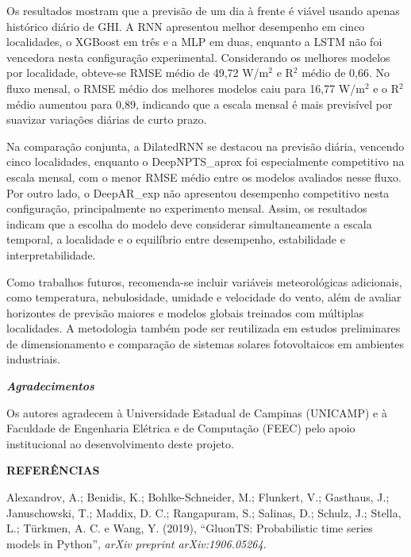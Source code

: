 \documentclass[12pt,a4paper]{article}
\begin{document}
Os resultados mostram que a previsão de um dia à frente é viável usando apenas histórico diário de GHI. A RNN apresentou melhor desempenho em cinco localidades, o XGBoost em três e a MLP em duas, enquanto a LSTM não foi vencedora nesta configuração experimental. Considerando os melhores modelos por localidade, obteve-se RMSE médio de 49,72 W/m$^2$ e R$^2$ médio de 0,66. No fluxo mensal, o RMSE médio dos melhores modelos caiu para 16,77 W/m$^2$ e o R$^2$ médio aumentou para 0,89, indicando que a escala mensal é mais previsível por suavizar variações diárias de curto prazo.

Na comparação conjunta, a DilatedRNN se destacou na previsão diária, vencendo cinco localidades, enquanto o DeepNPTS\_aprox foi especialmente competitivo na escala mensal, com o menor RMSE médio entre os modelos avaliados nesse fluxo. Por outro lado, o DeepAR\_exp não apresentou desempenho competitivo nesta configuração, principalmente no experimento mensal. Assim, os resultados indicam que a escolha do modelo deve considerar simultaneamente a escala temporal, a localidade e o equilíbrio entre desempenho, estabilidade e interpretabilidade.

Como trabalhos futuros, recomenda-se incluir variáveis meteorológicas adicionais, como temperatura, nebulosidade, umidade e velocidade do vento, além de avaliar horizontes de previsão maiores e modelos globais treinados com múltiplas localidades. A metodologia também pode ser reutilizada em estudos preliminares de dimensionamento e comparação de sistemas solares fotovoltaicos em ambientes industriais.

\vspace{12pt}

\noindent\textbf{\textit{Agradecimentos}}

Os autores agradecem à Universidade Estadual de Campinas (UNICAMP) e à Faculdade de Engenharia Elétrica e de Computação (FEEC) pelo apoio institucional ao desenvolvimento deste projeto.

\vspace{12pt}

\noindent\textbf{REFERÊNCIAS}

\vspace{6pt}

\noindent Alexandrov, A.; Benidis, K.; Bohlke-Schneider, M.; Flunkert, V.; Gasthaus, J.; Januschowski, T.; Maddix, D. C.; Rangapuram, S.; Salinas, D.; Schulz, J.; Stella, L.; Türkmen, A. C. e Wang, Y. (2019), ``GluonTS: Probabilistic time series models in Python'', \textit{arXiv preprint arXiv:1906.05264}.
\end{document}
